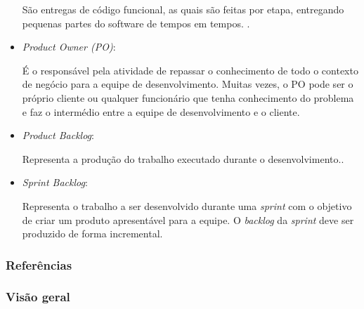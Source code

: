 \begin{itemize}
		São entregas de código funcional, as quais são feitas por etapa, entregando pequenas partes do software de tempos em tempos. \cite{beck2000extreme}.

	\item \textit{Product Owner (PO)}:

		É o responsável pela atividade de repassar o conhecimento de todo o contexto de negócio para a equipe de desenvolvimento. Muitas vezes, o PO pode ser o próprio cliente ou qualquer funcionário que tenha conhecimento do problema e faz o intermédio entre a equipe de desenvolvimento e o cliente. \cite{beck2000extreme}

	\item \textit{Product Backlog}:

		Representa a produção do trabalho executado durante o desenvolvimento.\cite{sanches2010aplicaccao}.

	\item \textit{Sprint Backlog}:

		Representa o trabalho a ser desenvolvido durante uma \textit{sprint} com o objetivo de criar um produto apresentável para a equipe. O \textit{backlog} da \textit{sprint} deve ser produzido de forma incremental.


\end{itemize}

\subsubsection{Referências}

\subsubsection{Visão geral}

